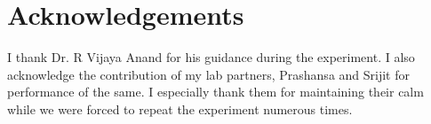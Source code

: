 \section{Acknowledgements}
I thank Dr. R Vijaya Anand for his guidance during the experiment. I also acknowledge the contribution of my lab partners, Prashansa and Srijit for performance of the same. I especially thank them for maintaining their calm while we were forced to repeat the experiment numerous times.